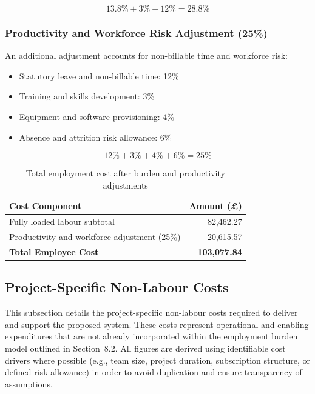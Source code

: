 \documentclass{article}
\begin{document}
\[
13.8\% + 3\% + 12\% = 28.8\%
\]

\subsubsection*{Productivity and Workforce Risk Adjustment (25\%)}

An additional adjustment accounts for non-billable time and workforce risk:

\begin{itemize}[itemsep=2pt, topsep=4pt, parsep=0pt]
    \item Statutory leave and non-billable time: 12\%
    \item Training and skills development: 3\%
    \item Equipment and software provisioning: 4\%
    \item Absence and attrition risk allowance: 6\%
\end{itemize}

\[
12\% + 3\% + 4\% + 6\% = 25\%
\]

\begin{table}[h]
\centering
\begin{tabular}{|l|r|}
\hline
\textbf{Cost Component} & \textbf{Amount (£)} \\
\hline
Fully loaded labour subtotal & 82,462.27 \\
Productivity and workforce adjustment (25\%) & 20,615.57 \\
\hline
\textbf{Total Employee Cost} & \textbf{103,077.84} \\
\hline
\end{tabular}
\caption{Total employment cost after burden and productivity adjustments}
\end{table}

\subsection{Project-Specific Non-Labour Costs}

This subsection details the project-specific non-labour costs required to deliver and support the proposed system. These costs represent operational and enabling expenditures that are not already incorporated within the employment burden model outlined in Section~8.2. All figures are derived using identifiable cost drivers where possible (e.g., team size, project duration, subscription structure, or defined risk allowance) in order to avoid duplication and ensure transparency of assumptions. \\
\end{document}
